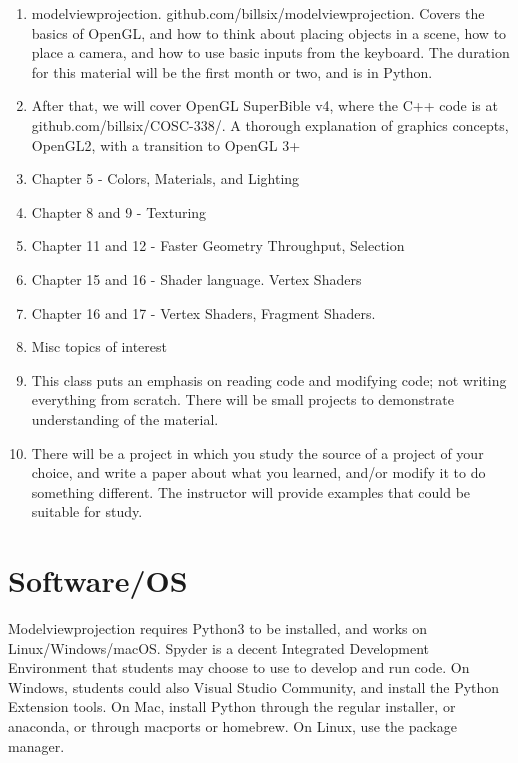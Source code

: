 \documentclass[11pt,twocolumn]{article}
\begin{document}
\begin{enumerate}
\item{modelviewprojection. github.com/billsix/modelviewprojection.  Covers the basics of
  OpenGL, and how to think about placing objects in a scene, how to place a camera, and
how to use basic inputs from the keyboard.  The duration for this material will be the first month or two, and is in Python.}
\item{After that, we will cover OpenGL SuperBible v4, where the C++ code is at github.com/billsix/COSC-338/.  A thorough explanation of graphics
concepts, OpenGL2, with a transition to OpenGL 3+}
\item{Chapter 5 - Colors, Materials, and Lighting}
\item{Chapter 8 and 9 - Texturing}
\item{Chapter 11 and 12 - Faster Geometry Throughput, Selection}
\item{Chapter 15 and 16 - Shader language.  Vertex Shaders}
\item{Chapter 16 and 17 - Vertex Shaders, Fragment Shaders.}
\item{Misc topics of interest}
\item{This class puts an emphasis on reading code and modifying code; not writing everything from scratch.
  There will be small projects to demonstrate understanding of the material.}
\item{There will be a project in which you study the source of a project of your choice,
  and write a paper about what you learned, and/or modify it to do something different.
  The instructor will provide examples that could be suitable for study.
  }

\end{enumerate}

\section{Software/OS}


Modelviewprojection requires Python3 to be installed, and works on Linux/Windows/macOS. Spyder
is a decent Integrated Development Environment that students may choose to use to develop and
run code.
On Windows, students could also Visual Studio Community, and install the Python Extension tools.
On Mac, install Python through the regular installer, or anaconda, or through macports or homebrew.
On Linux, use the package manager.
\end{document}
